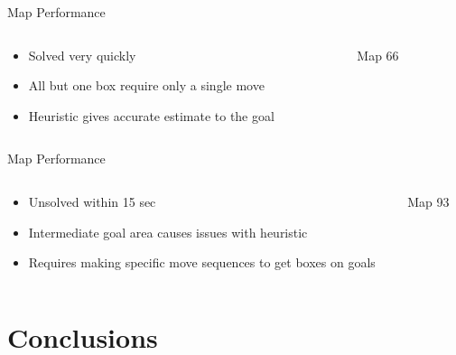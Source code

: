 \documentclass{beamer}
\begin{document}
\begin{frame}{Map Performance}
  \begin{columns}
    \begin{column}{.5\textwidth}
      \begin{itemize}
      \item Solved very quickly
      \item All but one box require only a single move
      \item Heuristic gives accurate estimate to the goal
      \end{itemize}
    \end{column}
    \begin{column}{.5\textwidth}
      \begin{block}{Map 66}
        \centering
        \usebox{\mapss}
      \end{block}
    \end{column}
  \end{columns}
\end{frame}

\begin{frame}{Map Performance}
  \begin{columns}
    \begin{column}{.5\textwidth}
      \begin{itemize}
      \item Unsolved within 15 sec
      \item Intermediate goal area causes issues with heuristic
      \item Requires making specific move sequences to get boxes on goals
      \end{itemize}
    \end{column}
    \begin{column}{.5\textwidth}
      \begin{block}{Map 93}
        \centering
        \usebox{\mapnt}
      \end{block}
    \end{column}
  \end{columns}
\end{frame}

\section{Conclusions}
\begin{frame}
  
\end{frame}
\end{document}
